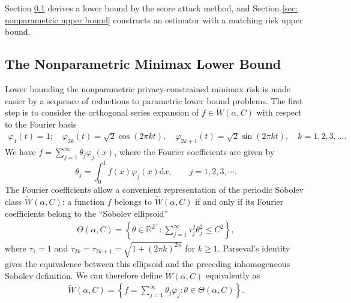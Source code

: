\documentclass[letterpaper,12pt]{article}
\renewcommand{\d}{\mathrm{d}}
\numberwithin{equation}{section}
\theoremstyle{plain}
\numberwithin{Theorem}{section}
\numberwithin{proposition}{section}
\numberwithin{Lemma}{section}
{
	\theoremstyle{definition}
	\newtheorem{Definition}{Definition}
	\newtheorem{example}{Example}
	\numberwithin{example}{section}
	\newtheorem{fact}{Fact}
	\numberwithin{fact}{section}
	\newtheorem{remark}{Remark}
}
\newcommand{\rev}[1]{#1}
\newcommand{\furtherrev}[1]{#1}
\newcommand{\1}{\mathbbm{1}}
\def\R{{\mathbb R}}
\begin{document}
	Section \ref{sec: nonparametric lower bound} derives a lower bound by the score attack method, and Section \ref{sec: nonparametric upper bound} constructs an estimator with a matching risk upper bound.
	
	
	
	\subsection{The \texorpdfstring{\furtherrev{Nonparametric}}{Nonparametric} Minimax Lower Bound}\label{sec: nonparametric lower bound}
	Lower bounding the \furtherrev{nonparametric} privacy-constrained minimax risk is made easier by a sequence of reductions to parametric lower bound problems. The first step is to consider the orthogonal series expansion of $f \in \tilde W(\alpha, C)$ with respect to the Fourier basis
	\begin{align*}
		\rev{\varphi_1(t) = 1;\quad \varphi_{2k}(t) = \sqrt{2}\cos(2\pi k t),\quad \varphi_{2k+1}(t) = \sqrt{2}\sin(2\pi k t),\quad k = 1, 2, 3, \ldots.}
	\end{align*}
	We have $f = \sum_{j=1}^\infty \theta_j \varphi_j(x)$, where the Fourier coefficients are given by
\[
		\theta_j = \int_0^1 f(x)\varphi_j(x) \d x,\qquad j = 1, 2, 3, \cdots.
\]
	The Fourier coefficients allow a convenient representation of the periodic Sobolev class $\tilde W(\alpha, C)$: a function $f$ belongs to $\tilde W(\alpha, C)$ if and only if its Fourier coefficients belong to the ``Sobolev ellipsoid''
	{\begin{align}\label{eq: Sobolev ellipsoid definition}
		\Theta(\alpha, C) = \left\{\theta \in \R^{\mathbb Z^{+}}: \sum_{j=1}^\infty \tau_j^2 \theta_j^2 \leq C^2\right\},
	\end{align}
	where $\tau_1=1$ and $\tau_{2k}=\tau_{2k+1}=\sqrt{1+(2\pi k)^{2\alpha}}$ for $k\geq1$. Parseval's identity gives the equivalence between this ellipsoid and the preceding inhomogeneous Sobolev definition.} We can therefore define $\tilde W(\alpha, C)$ equivalently as
	\begin{align*}
		\tilde W(\alpha, C) = \left\{f = \sum_{j=1}^\infty \theta_j \varphi_j: \theta \in \Theta(\alpha, C)\right\}.
	\end{align*}
	
\end{document}

